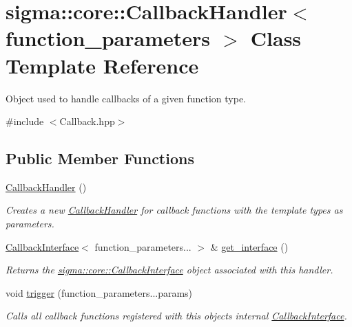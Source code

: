 \hypertarget{classsigma_1_1core_1_1_callback_handler}{}\section{sigma\+:\+:core\+:\+:Callback\+Handler$<$ function\+\_\+parameters $>$ Class Template Reference}
\label{classsigma_1_1core_1_1_callback_handler}


Object used to handle callbacks of a given function type.  




{\ttfamily \#include $<$Callback.\+hpp$>$}

\subsection*{Public Member Functions}
\begin{DoxyCompactItemize}
\item 
\hypertarget{classsigma_1_1core_1_1_callback_handler_a640cd1f70da16d82b91a52f6c4e3a7bb}{}\hyperlink{classsigma_1_1core_1_1_callback_handler_a640cd1f70da16d82b91a52f6c4e3a7bb}{Callback\+Handler} ()\label{classsigma_1_1core_1_1_callback_handler_a640cd1f70da16d82b91a52f6c4e3a7bb}

\begin{DoxyCompactList}\small\item\em Creates a new \hyperlink{classsigma_1_1core_1_1_callback_handler}{Callback\+Handler} for callback functions with the template types as parameters. \end{DoxyCompactList}\item 
\hyperlink{classsigma_1_1core_1_1_callback_interface}{Callback\+Interface}$<$ function\+\_\+parameters... $>$ \& \hyperlink{classsigma_1_1core_1_1_callback_handler_ab9ba3abc6d94c0726de2c1dfa0056da0}{get\+\_\+interface} ()
\begin{DoxyCompactList}\small\item\em Returns the \hyperlink{classsigma_1_1core_1_1_callback_interface}{sigma\+::core\+::\+Callback\+Interface} object associated with this handler. \end{DoxyCompactList}\item 
void \hyperlink{classsigma_1_1core_1_1_callback_handler_a565178d287893492a86112d67a5302f8}{trigger} (function\+\_\+parameters...\+params)
\begin{DoxyCompactList}\small\item\em Calls all callback functions registered with this object\textquotesingle{}s internal \hyperlink{classsigma_1_1core_1_1_callback_interface}{Callback\+Interface}. \end{DoxyCompactList}\end{DoxyCompactItemize}


